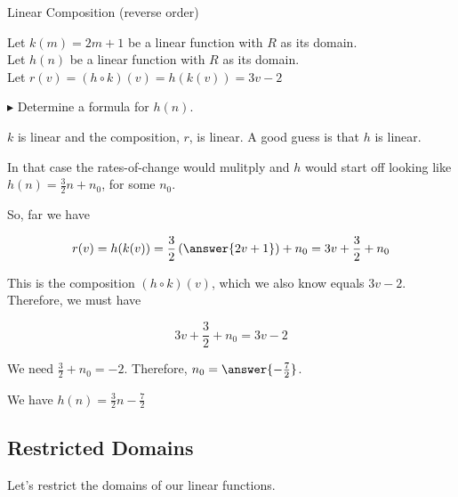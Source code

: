 \documentclass{ximera}
\begin{document}
\begin{example} Linear Composition (reverse order)

Let $k(m) = 2 m + 1$ be a linear function with \textbf{$R$} as its domain. \\
Let $h(n)$ be a linear function with \textbf{$R$} as its domain. \\


Let $r(v) = (h \circ k)(v) = h(k(v)) = 3 v - 2$ 

$\blacktriangleright$  Determine a formula for $h(n)$.




\begin{explanation}


$k$ is linear and the composition, $r$, is linear. A good guess is that $h$ is linear.  

In that case the rates-of-change would mulitply and $h$ would start off looking like $h(n) = \frac{3}{2} n + n_0$, for some $n_0$.


So, far we have 

\[   r(v) = h(k(v)) = \frac{3}{2} \left( \answer{2 v + 1} \right) + n_0 =  3 v + \frac{3}{2} + n_0\]


This is the composition $(h \circ k)(v)$, which we also know equals $3 v - 2$.  Therefore, we must have 

\[
3 v + \frac{3}{2} + n_0  = 3 v - 2
\]


We need $\frac{3}{2} + n_0 = -2$.  Therefore, $n_0 = \answer{-\frac{7}{2}}$.


We have $h(n) = \frac{3}{2} n - \frac{7}{2}$


\end{explanation}
\end{example}

















\subsection*{Restricted Domains}


Let's restrict the domains of our linear functions.
\end{document}
